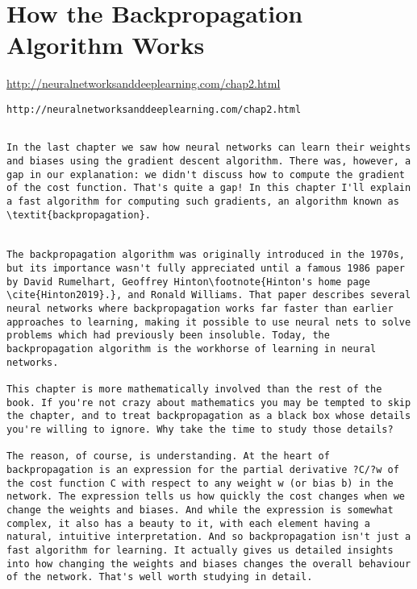 
\chapter{How the Backpropagation Algorithm Works}

\url{http://neuralnetworksanddeeplearning.com/chap2.html}

\lstinline{http://neuralnetworksanddeeplearning.com/chap2.html}


\begin{lstlisting}

In the last chapter we saw how neural networks can learn their weights and biases using the gradient descent algorithm. There was, however, a gap in our explanation: we didn't discuss how to compute the gradient of the cost function. That's quite a gap! In this chapter I'll explain a fast algorithm for computing such gradients, an algorithm known as \textit{backpropagation}. 


The backpropagation algorithm was originally introduced in the 1970s, but its importance wasn't fully appreciated until a famous 1986 paper by David Rumelhart, Geoffrey Hinton\footnote{Hinton's home page \cite{Hinton2019}.}, and Ronald Williams. That paper describes several neural networks where backpropagation works far faster than earlier approaches to learning, making it possible to use neural nets to solve problems which had previously been insoluble. Today, the backpropagation algorithm is the workhorse of learning in neural networks.

This chapter is more mathematically involved than the rest of the book. If you're not crazy about mathematics you may be tempted to skip the chapter, and to treat backpropagation as a black box whose details you're willing to ignore. Why take the time to study those details?

The reason, of course, is understanding. At the heart of backpropagation is an expression for the partial derivative ?C/?w of the cost function C with respect to any weight w (or bias b) in the network. The expression tells us how quickly the cost changes when we change the weights and biases. And while the expression is somewhat complex, it also has a beauty to it, with each element having a natural, intuitive interpretation. And so backpropagation isn't just a fast algorithm for learning. It actually gives us detailed insights into how changing the weights and biases changes the overall behaviour of the network. That's well worth studying in detail.


\end{lstlisting}
